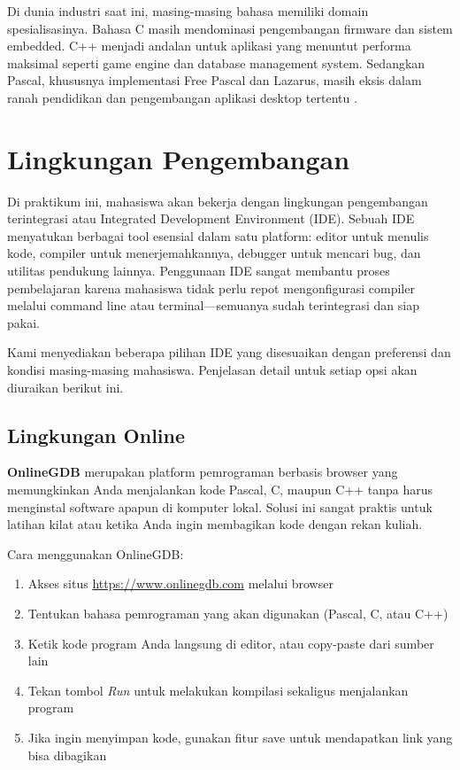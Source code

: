 \documentclass[../main.tex]{subfiles}
\begin{document}
Di dunia industri saat ini, masing-masing bahasa memiliki domain spesialisasinya. Bahasa C masih mendominasi pengembangan firmware dan sistem embedded. C++ menjadi andalan untuk aplikasi yang menuntut performa maksimal seperti game engine dan database management system. Sedangkan Pascal, khususnya implementasi Free Pascal dan Lazarus, masih eksis dalam ranah pendidikan dan pengembangan aplikasi desktop tertentu \parencite{free-pascal-docs}.

\section{Lingkungan Pengembangan}
Di praktikum ini, mahasiswa akan bekerja dengan lingkungan pengembangan terintegrasi atau Integrated Development Environment (IDE). Sebuah IDE menyatukan berbagai tool esensial dalam satu platform: editor untuk menulis kode, compiler untuk menerjemahkannya, debugger untuk mencari bug, dan utilitas pendukung lainnya. Penggunaan IDE sangat membantu proses pembelajaran karena mahasiswa tidak perlu repot mengonfigurasi compiler melalui command line atau terminal—semuanya sudah terintegrasi dan siap pakai.

Kami menyediakan beberapa pilihan IDE yang disesuaikan dengan preferensi dan kondisi masing-masing mahasiswa. Penjelasan detail untuk setiap opsi akan diuraikan berikut ini.

\subsection{Lingkungan Online}
\textbf{OnlineGDB} \parencite{onlinegdb} merupakan platform pemrograman berbasis browser yang memungkinkan Anda menjalankan kode Pascal, C, maupun C++ tanpa harus menginstal software apapun di komputer lokal. Solusi ini sangat praktis untuk latihan kilat atau ketika Anda ingin membagikan kode dengan rekan kuliah.

Cara menggunakan OnlineGDB:
\begin{enumerate}
  \item Akses situs \url{https://www.onlinegdb.com} melalui browser
  \item Tentukan bahasa pemrograman yang akan digunakan (Pascal, C, atau C++)
  \item Ketik kode program Anda langsung di editor, atau copy-paste dari sumber lain
  \item Tekan tombol \emph{Run} untuk melakukan kompilasi sekaligus menjalankan program
  \item Jika ingin menyimpan kode, gunakan fitur save untuk mendapatkan link yang bisa dibagikan
\end{enumerate}
\end{document}
